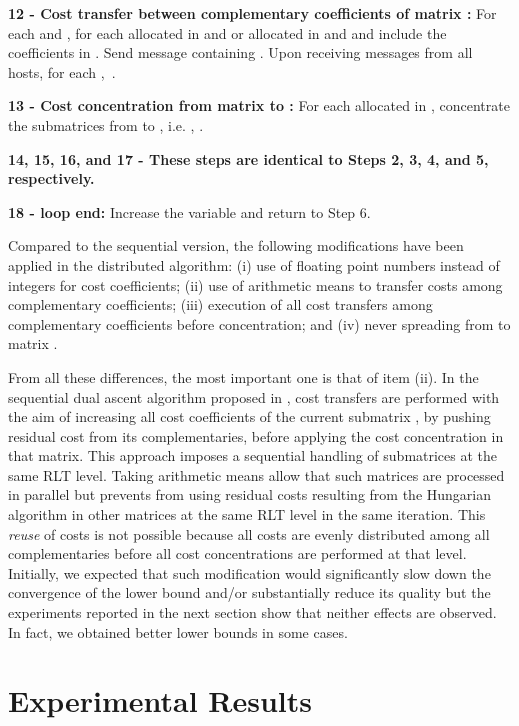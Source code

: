 \documentclass[authoryear,12pt,a4paper,times]{elsarticle}
\begin{document}
\noindent
{\bf 12 - Cost transfer between complementary coefficients of matrix :}
For each  and , for each  allocated in  and  or  allocated in  and  and 
include the coefficients  in . Send message containing .
Upon receiving messages from all hosts, for each ,\ .

\noindent
{\bf 13 - Cost concentration from matrix  to :} For each  allocated in , concentrate 
the submatrices from  to , i.e. ,  .

\noindent
{\bf 14, 15, 16, and 17 - These steps are identical to Steps 2, 3, 4, and 5, respectively.}

\noindent
{\bf 18 - loop end:} Increase the variable  and return to Step 6.

Compared to the sequential version, the following modifications have been applied in the distributed algorithm:
(i) use of floating point numbers instead of integers for cost coefficients;
(ii) use of arithmetic means to transfer costs among complementary coefficients;
(iii) execution of all cost transfers among complementary coefficients before concentration; and
(iv) never spreading from  to matrix .

From all these differences, the most important one is that of item (ii).
In the sequential dual ascent algorithm proposed in \citet{hahn2012}, cost transfers are performed with the
aim of increasing all cost coefficients of the current submatrix , by pushing residual cost from its
complementaries, before applying the cost concentration in that matrix.
This approach imposes a sequential handling of submatrices at the same RLT level.
Taking arithmetic means allow that such matrices are processed in parallel but prevents from using residual
costs resulting from the Hungarian algorithm in other matrices at the same RLT level in the same iteration.
This {\it reuse} of costs is not possible because all costs are evenly distributed among all complementaries
before all cost concentrations are performed at that level.
Initially, we expected that such modification would significantly slow down the convergence of the lower bound
and/or substantially reduce its quality but the experiments reported in the next section show that neither
effects are observed.
In fact, we obtained better lower bounds in some cases.

\section{Experimental Results} \label{sec:resultados}
\end{document}
